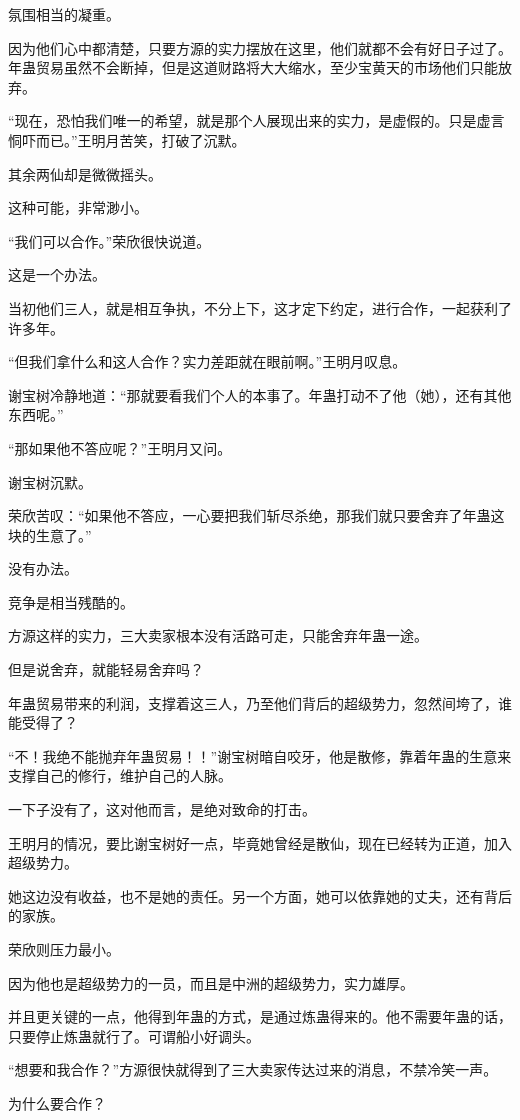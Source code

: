 \begin{this_body}
氛围相当的凝重。

因为他们心中都清楚，只要方源的实力摆放在这里，他们就都不会有好日子过了。年蛊贸易虽然不会断掉，但是这道财路将大大缩水，至少宝黄天的市场他们只能放弃。

“现在，恐怕我们唯一的希望，就是那个人展现出来的实力，是虚假的。只是虚言恫吓而已。”王明月苦笑，打破了沉默。

其余两仙却是微微摇头。

这种可能，非常渺小。

“我们可以合作。”荣欣很快说道。

这是一个办法。

当初他们三人，就是相互争执，不分上下，这才定下约定，进行合作，一起获利了许多年。

“但我们拿什么和这人合作？实力差距就在眼前啊。”王明月叹息。

谢宝树冷静地道：“那就要看我们个人的本事了。年蛊打动不了他（她），还有其他东西呢。”

“那如果他不答应呢？”王明月又问。

谢宝树沉默。

荣欣苦叹：“如果他不答应，一心要把我们斩尽杀绝，那我们就只要舍弃了年蛊这块的生意了。”

没有办法。

竞争是相当残酷的。

方源这样的实力，三大卖家根本没有活路可走，只能舍弃年蛊一途。

但是说舍弃，就能轻易舍弃吗？

年蛊贸易带来的利润，支撑着这三人，乃至他们背后的超级势力，忽然间垮了，谁能受得了？

“不！我绝不能抛弃年蛊贸易！！”谢宝树暗自咬牙，他是散修，靠着年蛊的生意来支撑自己的修行，维护自己的人脉。

一下子没有了，这对他而言，是绝对致命的打击。

王明月的情况，要比谢宝树好一点，毕竟她曾经是散仙，现在已经转为正道，加入超级势力。

她这边没有收益，也不是她的责任。另一个方面，她可以依靠她的丈夫，还有背后的家族。

荣欣则压力最小。

因为他也是超级势力的一员，而且是中洲的超级势力，实力雄厚。

并且更关键的一点，他得到年蛊的方式，是通过炼蛊得来的。他不需要年蛊的话，只要停止炼蛊就行了。可谓船小好调头。

“想要和我合作？”方源很快就得到了三大卖家传达过来的消息，不禁冷笑一声。

为什么要合作？


\end{this_body}

